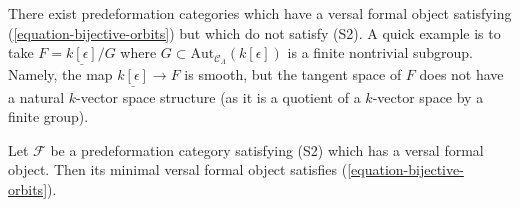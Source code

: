 \begin{example}
\label{example-do-not-get-S2}
There exist predeformation categories which have a versal formal
object satisfying (\ref{equation-bijective-orbits}) but which do not
satisfy (S2). A quick example is to take $F = \underline{k[\epsilon]}/G$
where $G \subset \text{Aut}_{\mathcal{C}_\Lambda}(k[\epsilon])$
is a finite nontrivial subgroup. Namely, the map
$\underline{k[\epsilon]} \to F$ is smooth, but the tangent space
of $F$ does not have a natural $k$-vector space structure (as it is
a quotient of a $k$-vector space by a finite group).
\end{example}

\begin{lemma}
\label{lemma-construct-bijective-orbits}
Let $\mathcal{F}$ be a predeformation category satisfying
(S2) which has a versal formal object. Then its minimal versal
formal object satisfies (\ref{equation-bijective-orbits}).
\end{lemma}

